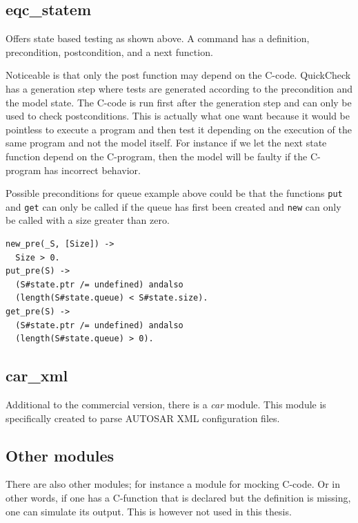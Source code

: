 \subsection{eqc\_statem}
\label{SEC:EQC_STATEM}
Offers state based testing as shown above. A command has a definition, precondition,
postcondition, and a next function.

Noticeable is that only the post function may depend on the
C-code. QuickCheck has a generation step where tests are generated
according to the precondition and the model state. The C-code is run
first after the generation step and can only be used to check
postconditions. This is actually what one want because it would be
pointless to execute a program and then test it depending on the
execution of the same program and not the model itself. For instance
if we let the next state function depend on the C-program, then the
model will be faulty if the C-program has incorrect behavior.

Possible preconditions for queue example above could be that the
functions \lstinline!put! and \lstinline!get! can only be called if
the queue has first been created and \lstinline!new! can only be
called with a size greater than zero.
\begin{lstlisting}
new_pre(_S, [Size]) ->
  Size > 0.
put_pre(S) ->
  (S#state.ptr /= undefined) andalso
  (length(S#state.queue) < S#state.size).
get_pre(S) ->
  (S#state.ptr /= undefined) andalso
  (length(S#state.queue) > 0).
\end{lstlisting}

\subsection{car\_xml}
Additional to the commercial version, there is a \emph{car} module. This module is
specifically created to parse AUTOSAR XML configuration files.

\subsection{Other modules}
\label{APP:SEC:OTHERMODULES}
There are also other modules; for instance a module for mocking C-code. Or in
other words, if one has a C-function that is declared but the
definition is missing, one can simulate its output. This is
however not used in this thesis.



